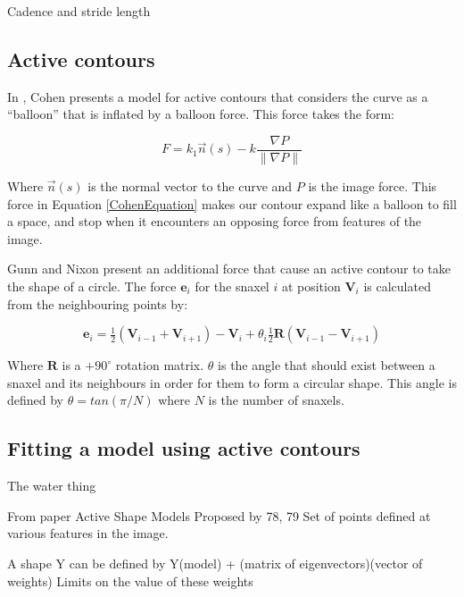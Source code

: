 Cadence and stride length \cite{GaitBook}

\subsection{Active contours}\label{ContourBackground}

In \cite{CohenBalloons}, Cohen presents a model for active contours that considers the curve as a ``balloon'' that is inflated by a balloon force.
This force takes the form:

\begin{equation}
	F = k_1 \vec{n}(s) - k\frac{\nabla P}{\|\nabla P\|}
	\label{CohenEquation}
\end{equation}

Where $\vec{n}(s)$ is the normal vector to the curve and $P$ is the image force.
This force in Equation \ref{CohenEquation} makes our contour expand like a balloon to fill a space, and stop when it encounters an opposing force from features of the image.

Gunn and Nixon present \cite{GunnSnakes} an additional force that cause an active contour to take the shape of a circle.
The force $\mathbf{e}_i$ for the snaxel $i$ at position $\mathbf{V}_i$ is calculated from the neighbouring points by:

\begin{equation}
	\mathbf{e}_i = \tfrac{1}{2}(\mathbf{V}_{i-1} + \mathbf{V}_{i+1}) - \mathbf{V}_i + \theta_i\tfrac{1}{2}\mathbf{R}(\mathbf{V}_{i-1} - \mathbf{V}_{i+1})
\end{equation}

Where $\mathbf{R}$ is a $+90^\circ$ rotation matrix.
$\theta$ is the angle that should exist between a snaxel and its neighbours in order for them to form a circular shape.
This angle is defined by $\theta = tan(\pi/N)$ where $N$ is the number of snaxels.



\subsection{Fitting a model using active contours}

The water thing

From paper \cite{ImageSegModels}
Active Shape Models  Proposed by 78, 79
Set of points defined at various features in the image.

A shape Y can be defined by Y(model) + (matrix of eigenvectors)(vector of weights)
Limits on the value of these weights

